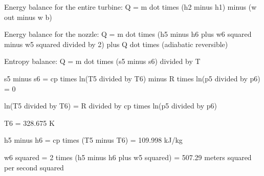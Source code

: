 Energy balance for the entire turbine:  
Q = m dot times (h2 minus h1) minus (w out minus w b)  

Energy balance for the nozzle:  
Q = m dot times (h5 minus h6 plus w6 squared minus w5 squared divided by 2) plus Q dot times (adiabatic reversible)  

Entropy balance:  
Q = m dot times (s5 minus s6) divided by T  

s5 minus s6 = cp times ln(T5 divided by T6) minus R times ln(p5 divided by p6) = 0  

ln(T5 divided by T6) = R divided by cp times ln(p5 divided by p6)  

T6 = 328.675 K  

h5 minus h6 = cp times (T5 minus T6) = 109.998 kJ/kg  

w6 squared = 2 times (h5 minus h6 plus w5 squared) = 507.29 meters squared per second squared